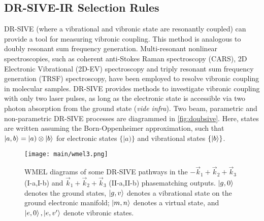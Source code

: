 \documentclass[aip, jcp, reprint, onecolumn]{revtex4-2}
\begin{document}
\subsection{DR-SIVE-IR Selection Rules}
DR-SIVE (where a vibrational and vibronic state are resonantly coupled) can provide a tool for measuring vibronic coupling.
This method is analogous to doubly resonant sum frequency generation. \cite{Shen94}
Multi-resonant nonlinear spectroscopies, such as coherent anti-Stokes Raman spectroscopy (CARS), 2D Electronic Vibrational (2D-EV) spectroscopy and triply resonant sum frequency generation (TRSF) spectroscopy, have been employed to resolve vibronic coupling in molecular samples. \cite{Carlson1990, Gaynor2017, RN276}
DR-SIVE provides methods to investigate vibronic coupling with only two laser pulses, as long as the electronic state is accessible via two photon absorption from the ground state (\textit{vide infra}).
Two beam, parametric and non-parametric DR-SIVE processes are diagrammed in \autoref{fig:doubsive}.
Here, states are written assuming the Born-Oppenheimer approximation, such that $\ket{a,b} = |a) \otimes \ket{b}$ for electronic states $\{|a)\}$ and vibrational states $\{\ket{b}\}$. \cite{BornOppenheimer, Albrecht1960}

\begin{figure}[!htbp]
	\centering
	\texttt{[image: main/wmel3.png]}
	\caption{WMEL diagrams of some DR-SIVE pathways in the $-\vec{k}_1 + \vec{k}_2+ \vec{k}_3$  (I-a,I-b) and $\vec{k}_1 + \vec{k}_2+ \vec{k}_3$ (II-a,II-b) phasematching outputs. $\ket{g,0}$ denotes the ground states, $\ket{g,v}$ denotes a vibrational state on the ground electronic manifold; $\ket{m,n}$ denotes a virtual state, and $\ket{e,0}, \ket{e,v'}$ denote vibronic states.}
	\label{fig:doubsive}
\end{figure}
\end{document}
